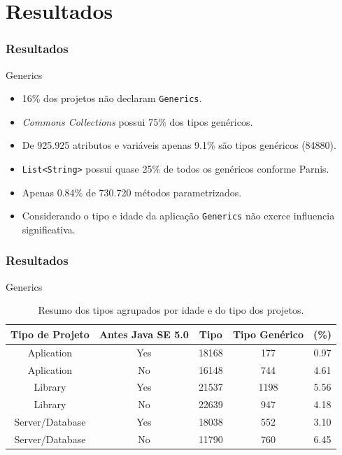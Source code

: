 \documentclass[]{beamer}
\begin{document}
		
	

	\section{Resultados}
	
	\begin{frame}[fragile, label=re]\frametitle{Resultados}
		\begin{block}{Generics}
			\begin{itemize}
				\item 16\% dos projetos não declaram \texttt{Generics}.
				
				\item \textit{Commons Collections} possui 75\% dos tipos genéricos.
				
				\item De 925.925 atributos e variáveis apenas 9.1\% são tipos genéricos (84880).
				
				\item \texttt{List<String>} possui quase 25\% de todos os genéricos conforme Parnis.
				
				\item Apenas 0.84\% de 730.720 métodos parametrizados.
				
				\item Considerando o tipo e idade da aplicação \texttt{Generics} não exerce influencia significativa.
				
			\end{itemize}
		\end{block}
	\end{frame}

	\begin{frame}[fragile, label=re]\frametitle{Resultados}
		\begin{block}{Generics}
				\begin{table}[h!]\footnotesize
					\centering
					\caption{Resumo dos tipos agrupados por idade e do tipo dos projetos.}
					\begin{tabular}{ccccc} \hline 
						Tipo de Projeto & Antes Java SE 5.0 & Tipo & Tipo Genérico & (\%) \\ \hline\hline
						Aplication & Yes & 18168 & 177 & 0.97 \\
						Aplication & No & 16148 & 744 & 4.61 \\
						Library & Yes & 21537 & 1198 & 5.56 \\
						Library & No & 22639 & 947 & 4.18 \\
						Server/Database & Yes & 18038 & 552 & 3.10 \\ 
						Server/Database & No & 11790 & 760 & 6.45 \\ \hline
					\end{tabular}
					\label{tab:std} %
				\end{table}
	
			\end{block}
		\end{frame}
		
\end{document}
